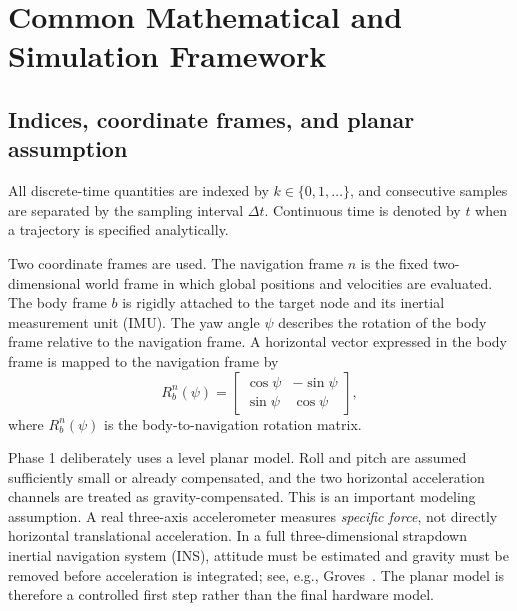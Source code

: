 \chapter{Common Mathematical and Simulation Framework}

\section{Indices, coordinate frames, and planar assumption}
All discrete-time quantities are indexed by $k\in\{0,1,\ldots\}$, and consecutive samples are separated by the sampling interval $\Delta t$. Continuous time is denoted by $t$ when a trajectory is specified analytically.

Two coordinate frames are used. The navigation frame $n$ is the fixed two-dimensional world frame in which global positions and velocities are evaluated. The body frame $b$ is rigidly attached to the target node and its inertial measurement unit (IMU). The yaw angle $\psi$ describes the rotation of the body frame relative to the navigation frame. A horizontal vector expressed in the body frame is mapped to the navigation frame by
\begin{equation}
R_b^n(\psi)=
\begin{bmatrix}
\cos\psi & -\sin\psi\\
\sin\psi & \cos\psi
\end{bmatrix},
\end{equation}
where $R_b^n(\psi)$ is the body-to-navigation rotation matrix.

Phase 1 deliberately uses a level planar model. Roll and pitch are assumed sufficiently small or already compensated, and the two horizontal acceleration channels are treated as gravity-compensated. This is an important modeling assumption. A real three-axis accelerometer measures \emph{specific force}, not directly horizontal translational acceleration. In a full three-dimensional strapdown inertial navigation system (INS), attitude must be estimated and gravity must be removed before acceleration is integrated; see, e.g., Groves~\cite{groves2013principles}. The planar model is therefore a controlled first step rather than the final hardware model.

